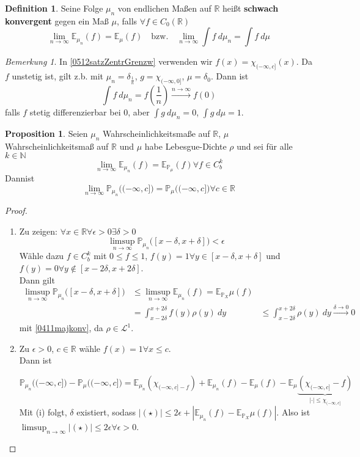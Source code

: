 \documentclass[10pt,a4paper]{article}
\newcommand{\N}{\ensuremath{\mathbb{N}}}
\newcommand{\R}{\ensuremath{\mathbb{R}}}
\newcommand{\abs}[1]{\left|#1\right|}
\newcommand{\Prb}{\mathbb P}
\newcommand{\Epv}{\ensuremath{\mathbb{E}}}
\newcommand{\scL}{\mathscr L}
\theoremstyle{plain}
\theoremstyle{definition}
\newtheorem{definition}[theorem]{Definition}
\newtheorem{prop}[theorem]{Proposition}
\theoremstyle{remark}
\newtheorem*{bem*}{Bemerkung}
\begin{document}
	\begin{definition}
		Seine Folge $\mu_n$ von endlichen Maßen auf $\R$ heißt \textbf{schwach konvergent} gegen ein Maß $\mu$, falls $\forall f\in C_0(\R)$
		\[\lim\limits_{n\to\infty}\Epv_{\mu_n}(f)=\Epv_{\mu}(f)\quad\text{bzw.}\quad\lim\limits_{n\to\infty}\int f~d\mu_n=\int f~d\mu\]
	\end{definition}
	
	\begin{bem*}
		In \ref{0512satzZentrGrenzw} verwenden wir $f(x)=\chi_{(-\infty,c]}(x)$. Da $f$ unstetig ist, gilt z.b. mit $\mu_n=\delta_{\frac{1}{n}}$, $g=\chi_{(-\infty,0]}$, $\mu=\delta_0$. Dann ist
		\[\int f~d\mu_n=f\left(\frac{1}{n}\right)\xrightarrow{n\to\infty}f(0)\]
		falls $f$ stetig differenzierbar bei $0$, aber $\int g~d\mu_n=0$, $\int g~d\mu=1$.
	\end{bem*}

	\begin{prop}\label{0515prop}
		Seien $\mu_n$ Wahrscheinlichkeitsmaße auf $\R$, $\mu$ Wahrscheinlichkeitsmaß auf $\R$ und $\mu$ habe Lebesgue-Dichte $\rho$ und sei für alle $k\in\N$
		\[\lim\limits_{n\to\infty}\Epv_{\mu_n}(f)=\Epv_{\Prb_\mu}(f)\forall f\in C_b^k\]
		Dannist
		\[\lim\limits_{n\to\infty}\Prb_{\mu_n}\big((-\infty,c]\big)=\Prb_\mu\big((-\infty,c]\big)\forall c\in\R\]
	\end{prop}
	\begin{proof}
		\begin{enumerate}[label=(\roman*)]
			\item Zu zeigen: $\forall x\in\R\forall\epsilon>0\exists\delta>0$
			\[\limsup_{n\to\infty}\Prb_{\mu_n}\big([x-\delta,x+\delta]\big)<\epsilon\]
			Wähle dazu $f\in C_b^k$ mit $0\leq f\leq 1$, $f(y)=1\forall y\in[x-\delta,x+\delta]$ und $f(y)=0\forall y\notin[x-2\delta,x+2\delta]$.\\
			Dann gilt
			\begin{align*}
			\limsup_{n\to\infty} \Prb_{\mu_n}\big([x-\delta,x+\delta]\big)&\leq \limsup_{n\to\infty} \Epv_{\mu_n}(f)=\Epv_{\Prb_X}\mu(f)\\
			&=\int_{x-2\delta}^{x+2\delta}f(y)\rho(y)~dy&\leq \int_{x-2\delta}^{x+2\delta}\rho(y)~dy\xrightarrow{\delta\to 0}0
			\end{align*}
			mit \ref{0411majkonv}, da $\rho\in\scL^1$.
			\item Zu $\epsilon>0$, $c\in\R$ wähle $f(x)=1\forall x\leq c$.\\
			Dann ist
			
			\[\Prb_{\mu_n}\big((-\infty,c]\big)-\Prb_\mu\big((-\infty,c]\big)=\Epv_{\mu_n}\left(\chi_{(-\infty,c]-f}\right)\tag{\star}+\Epv_{\mu_n}(f)-\Epv_{\mu}(f)-\Epv_\mu\underbrace{\left(\chi_{(-\infty,c]}-f\right)}_{|\cdot|\leq\chi_{(-\infty,c]}}\]
			Mit (i) folgt, $\delta$ existiert, sodass $|(\star)|\leq 2\epsilon+\abs{\Epv_{\mu_n}(f)-\Epv_{\Prb_X}\mu(f)}$.
			Also ist $\limsup_{n\to\infty}\abs{(\star)}\leq 2\epsilon\forall\epsilon>0$.
		\end{enumerate}
	\end{proof}
\end{document}
